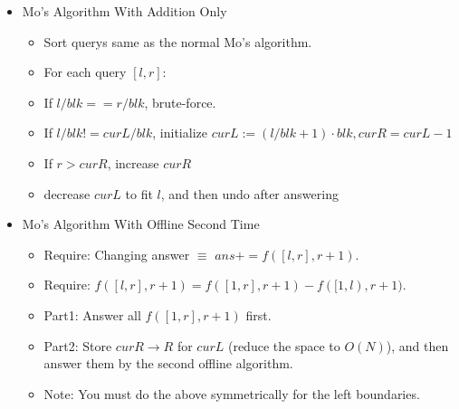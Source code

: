 \begin{itemize}
\item Mo's Algorithm With Addition Only

\begin{itemize}
    \itemsep-0.5em
    \item Sort querys same as the normal Mo's algorithm.
    \item For each query $[l, r]$:
    \item If $l / blk == r / blk$, brute-force.
    \item If $l / blk != curL / blk$, initialize $curL := (l / blk + 1) \cdot blk, curR = curL - 1$
    \item If $r > curR$, increase $curR$
    \item decrease $curL$ to fit $l$, and then undo after answering
\end{itemize}

\item Mo's Algorithm With Offline Second Time

\begin{itemize}
    \itemsep-0.5em
    \item Require: Changing answer $\equiv$ $ans += f([l, r], r + 1)$.
    \item Require: $f([l, r], r + 1) = f([1, r], r + 1) - f([1, l), r + 1)$.
    \item Part1: Answer all $f([1, r], r + 1)$ first.
    \item Part2: Store $curR \to R$ for $curL$ (reduce the space to $O(N)$), and then answer them by the second offline algorithm.
    \item Note: You must do the above symmetrically for the left boundaries.
\end{itemize}
\end{itemize}
